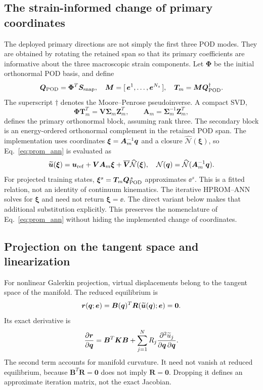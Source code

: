 \subsection{The strain-informed change of primary coordinates}
\label{sec:primary_coordinates}
The deployed primary directions are not simply the first three POD modes. They are obtained by rotating the retained span so that its primary coefficients are informative about the three macroscopic strain components. Let $\bm\Phi$ be the initial orthonormal POD basis, and define
\begin{equation}
 \bm Q_{\rm POD}=\bm\Phi^T\bm S_{\rm snap},\quad
 \bm M=[\,\bm e^1,\ldots,\bm e^{N_s}\,],\quad
 \bm T_m=\bm M\bm Q_{\rm POD}^{\dagger}.
\end{equation}
The superscript $\dagger$ denotes the Moore--Penrose pseudoinverse. A compact SVD,
\begin{equation}
 \bm\Phi\bm T_m^T=\bm V\bm\Sigma_m\bm Z_m^T,
 \qquad \bm A_m=\bm\Sigma_m^{-1}\bm Z_m^T,
 \label{eq:strain_informed_rotation}
\end{equation}
defines the primary orthonormal block, assuming rank three. The secondary block is an energy-ordered orthonormal complement in the retained POD span. The implementation uses coordinates
$\bm\xi=\bm A_m^{-1}\bm q$ and a closure $\widehat{\mathcal N}(\bm\xi)$, so Eq.~\eqref{eq:prom_ann} is evaluated as
\begin{equation}
 \widetilde{\bm u}(\bm\xi)=\bm u_{\rm ref}
   +\bm V\bm A_m\bm\xi
   +\overline{\bm V}\widehat{\mathcal N}(\bm\xi),
 \quad
 \mathcal N(\bm q)=\widehat{\mathcal N}(\bm A_m^{-1}\bm q).
 \label{eq:deployed_decoder}
\end{equation}
For projected training states, $\bm\xi^s=\bm T_m\bm Q_{\rm POD}^{\,s}$ approximates $\ee^s$. This is a fitted relation, not an identity of continuum kinematics. The iterative HPROM--ANN solves for $\bm\xi$ and need not return $\bm\xi=\ee$. The direct variant below makes that additional substitution explicitly. This preserves the nomenclature of Eq.~\eqref{eq:prom_ann} without hiding the implemented change of coordinates.

\subsection{Projection on the tangent space and linearization}
For nonlinear Galerkin projection, virtual displacements belong to the tangent space of the manifold. The reduced equilibrium is
\begin{equation}
 \bm r(\bm q;\bm e)=\bm B(\bm q)^T
          \bm R(\widetilde{\bm u}(\bm q);\bm e)=\bm0.
 \label{eq:manifold_galerkin}
\end{equation}
Its exact derivative is
\begin{equation}
 \frac{\partial\bm r}{\partial\bm q}
 =\bm B^T\bm K\bm B
  +\sum_{j=1}^{N}R_j
             \frac{\partial^2\widetilde u_j}{\partial\bm q\,\partial\bm q}.
 \label{eq:manifold_hessian}
\end{equation}
The second term accounts for manifold curvature. It need not vanish at reduced equilibrium, because $\bm B^T\bm R=\bm0$ does not imply $\bm R=\bm0$. Dropping it defines an approximate iteration matrix, not the exact Jacobian.

